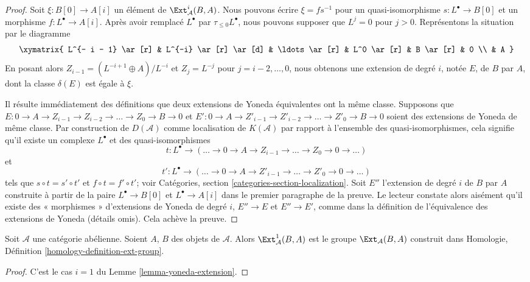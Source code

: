 \begin{proof}
Soit $\xi : B[0] \to A[i]$ un élément de $\Ext^i_\mathcal{A}(B, A)$.
Nous pouvons écrire $\xi = f s^{-1}$ pour un quasi-isomorphisme
$s : L^\bullet \to B[0]$ et un morphisme $f : L^\bullet \to A[i]$.
Après avoir remplacé $L^\bullet$ par $\tau_{\leq 0}L^\bullet$, nous pouvons
supposer que $L^j = 0$ pour $j > 0$. Représentons la situation par le diagramme
$$
\xymatrix{
L^{- i - 1} \ar[r] & L^{-i} \ar[r] \ar[d] & \ldots \ar[r] &
L^0 \ar[r] & B \ar[r] & 0 \\
& A
}
$$
En posant alors $Z_{i - 1} = (L^{- i + 1} \oplus A)/L^{-i}$ et
$Z_j = L^{-j}$ pour $j = i - 2, \ldots, 0$, nous obtenons une extension de
degré $i$, notée $E$, de $B$ par $A$, dont la classe $\delta(E)$ est égale à
$\xi$.

\medskip\noindent
Il résulte immédiatement des définitions que deux extensions de Yoneda
équivalentes ont la même classe. Supposons que
$E : 0 \to A \to Z_{i - 1} \to Z_{i - 2} \to \ldots \to Z_0 \to B \to 0$ et
$E' : 0 \to A \to Z'_{i - 1} \to Z'_{i - 2} \to \ldots \to Z'_0 \to B \to 0$
soient des extensions de Yoneda de même classe.
Par construction de $D(\mathcal{A})$ comme localisation de
$K(\mathcal{A})$ par rapport à l'ensemble des quasi-isomorphismes, cela
signifie qu'il existe un complexe $L^\bullet$ et des quasi-isomorphismes
$$
t : L^\bullet \to
(\ldots \to 0 \to A \to Z_{i - 1} \to \ldots \to Z_0 \to 0 \to \ldots)
$$
et
$$
t' : L^\bullet \to
(\ldots \to 0 \to A \to Z'_{i - 1} \to \ldots \to Z'_0 \to 0 \to \ldots)
$$
tels que $s \circ t = s' \circ t'$ et $f \circ t = f' \circ t'$; voir
Catégories, section \ref{categories-section-localization}.
Soit $E''$ l'extension de degré $i$ de $B$ par $A$ construite à partir de
la paire $L^\bullet \to B[0]$ et $L^\bullet \to A[i]$ dans le premier
paragraphe de la preuve. Le lecteur constate alors aisément qu'il existe
des « morphismes » d'extensions de Yoneda de degré $i$, $E'' \to E$ et
$E'' \to E'$, comme dans la définition de l'équivalence des extensions
de Yoneda (détails omis). Cela achève la preuve.
\end{proof}

\begin{lemma}
\label{lemma-ext-1}
Soit $\mathcal{A}$ une catégorie abélienne. Soient $A$, $B$ des objets
de $\mathcal{A}$. Alors $\Ext^1_\mathcal{A}(B, A)$ est le groupe
$\Ext_\mathcal{A}(B, A)$ construit dans
Homologie, Définition \ref{homology-definition-ext-group}.
\end{lemma}

\begin{proof}
C'est le cas $i = 1$ du
Lemme \ref{lemma-yoneda-extension}.
\end{proof}

